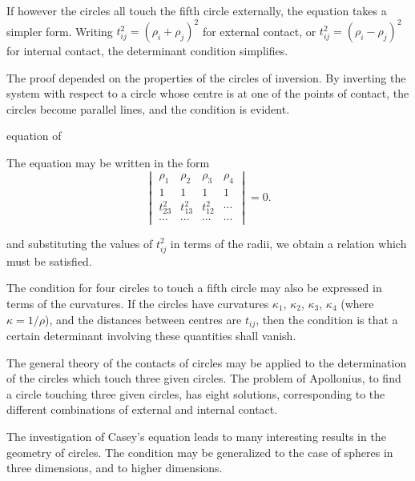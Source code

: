 \documentclass[11pt,a4paper]{article}
\theoremstyle{plain}
\begin{document}
\newpage
\setcounter{equation}{1}

If however the circles all touch the fifth circle externally, the equation takes a simpler form. Writing $t_{ij}^2 = (\rho_i + \rho_j)^2$ for external contact, or $t_{ij}^2 = (\rho_i - \rho_j)^2$ for internal contact, the determinant condition simplifies.

The proof depended on the properties of the circles of inversion. By inverting the system with respect to a circle whose centre is at one of the points of contact, the circles become parallel lines, and the condition is evident.

\newpage
\setcounter{equation}{1}

equation of

The equation may be written in the form
\begin{equation}
\begin{vmatrix}
\rho_1 & \rho_2 & \rho_3 & \rho_4 \\
1 & 1 & 1 & 1 \\
t_{23}^2 & t_{13}^2 & t_{12}^2 & \cdots \\
\cdots & \cdots & \cdots & \cdots
\end{vmatrix} = 0.
\end{equation}

\newpage
\setcounter{equation}{2}

and substituting the values of $t_{ij}^2$ in terms of the radii, we obtain a relation which must be satisfied.

The condition for four circles to touch a fifth circle may also be expressed in terms of the curvatures. If the circles have curvatures $\kappa_1$, $\kappa_2$, $\kappa_3$, $\kappa_4$ (where $\kappa = 1/\rho$), and the distances between centres are $t_{ij}$, then the condition is that a certain determinant involving these quantities shall vanish.

\newpage
\setcounter{equation}{2}

The general theory of the contacts of circles may be applied to the determination of the circles which touch three given circles. The problem of Apollonius, to find a circle touching three given circles, has eight solutions, corresponding to the different combinations of external and internal contact.

\newpage
\setcounter{equation}{2}

The investigation of Casey's equation leads to many interesting results in the geometry of circles. The condition may be generalized to the case of spheres in three dimensions, and to higher dimensions.
\end{document}
